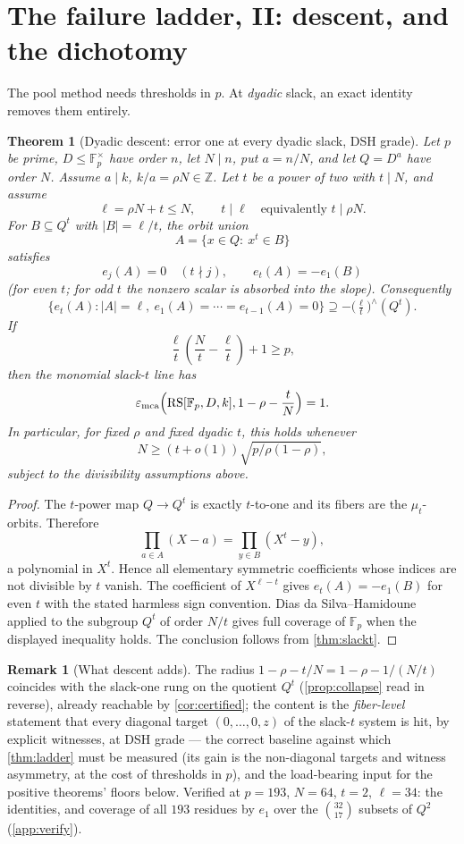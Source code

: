 \documentclass[11pt]{article}
\newtheorem{theorem}{Theorem}[section]
\theoremstyle{definition}
\newtheorem{remark}[remark]{Remark}
\newcommand{\F}{\mathbb F}
\newcommand{\Z}{\mathbb Z}
\newcommand{\eps}{\varepsilon}
\newcommand{\RS}{\mathrm{RS}}
\newcommand{\emca}{\eps_{\rm mca}}
\begin{document}
\section{The failure ladder, II: descent, and the dichotomy}\label{sec:descent}

The pool method needs thresholds in $p$.  At \emph{dyadic} slack, an exact identity removes them entirely.

\begin{theorem}[Dyadic descent: error one at every dyadic slack, DSH grade]\label{thm:descent}
Let $p$ be prime, $D\le\F_p^\times$ have order $n$, let $N\mid n$, put $a=n/N$, and let $Q=D^a$ have order $N$.  Assume $a\mid k$, $k/a=\rho N\in\Z$.  Let $t$ be a power of two with $t\mid N$, and assume
\[
        \ell=\rho N+t\le N,
        \qquad t\mid \ell
        \quad\text{equivalently } t\mid\rho N .
\]
For $B\subseteq Q^t$ with $|B|=\ell/t$, the orbit union
\[
        A=\{x\in Q:\ x^t\in B\}
\]
satisfies
\[
        e_j(A)=0\quad(t\nmid j),
        \qquad e_t(A)=-e_1(B)
\]
(for even $t$; for odd $t$ the nonzero scalar is absorbed into the slope).  Consequently
\[
        \{e_t(A): |A|=\ell,\ e_1(A)=\cdots=e_{t-1}(A)=0\}
        \supseteq -\big(\tfrac\ell t\big)^{\wedge}(Q^t).
\]
If
\[
        \frac\ell t\left(\frac Nt-\frac\ell t\right)+1\ge p,
\]
then the monomial slack-$t$ line has
\[
        \emca\Big(\RS[\F_p,D,k],1-\rho-\frac tN\Big)=1.
\]
In particular, for fixed $\rho$ and fixed dyadic $t$, this holds whenever
\[
        N\ge(t+o(1))\sqrt{p/\rho(1-\rho)},
\]
subject to the divisibility assumptions above.
\end{theorem}

\begin{proof}
The $t$-power map $Q\to Q^t$ is exactly $t$-to-one and its fibers are the $\mu_t$-orbits.  Therefore
\[
        \prod_{a\in A}(X-a)=\prod_{y\in B}(X^t-y),
\]
a polynomial in $X^t$.  Hence all elementary symmetric coefficients whose indices are not divisible by $t$ vanish.  The coefficient of $X^{\ell-t}$ gives $e_t(A)=-e_1(B)$ for even $t$ with the stated harmless sign convention.  Dias da Silva--Hamidoune applied to the subgroup $Q^t$ of order $N/t$ gives full coverage of $\F_p$ when the displayed inequality holds.  The conclusion follows from \cref{thm:slackt}.
\end{proof}

\begin{remark}[What descent adds]\label{rem:descenth}
The radius $1-\rho-t/N=1-\rho-1/(N/t)$ coincides with the slack-one rung on the quotient $Q^t$ (\cref{prop:collapse} read in reverse), already reachable by \cref{cor:certified}; the content is the \emph{fiber-level} statement that every diagonal target $(0,\dots,0,z)$ of the slack-$t$ system is hit, by explicit witnesses, at DSH grade --- the correct baseline against which \cref{thm:ladder} must be measured (its gain is the non-diagonal targets and witness asymmetry, at the cost of thresholds in $p$), and the load-bearing input for the positive theorems' floors below.  Verified at $p=193$, $N=64$, $t=2$, $\ell=34$: the identities, and coverage of all $193$ residues by $e_1$ over the $\binom{32}{17}$ subsets of $Q^2$ (\cref{app:verify}).
\end{remark}
\end{document}
